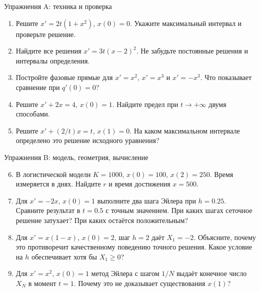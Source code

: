 \documentclass[aspectratio=169,11pt]{beamer}
\begin{document}
\begin{frame}{Упражнения A: техника и проверка}
\begin{enumerate}
\item Решите $x'=2t(1+x^2)$, $x(0)=0$.
Укажите максимальный интервал и проверьте решение.
\item Найдите все решения $x'=3t(x-2)^2$.
Не забудьте постоянные решения и интервалы определения.
\item Постройте фазовые прямые для $x'=x^2$,
$x'=x^3$ и $x'=-x^3$. Что показывает сравнение при $q'(0)=0$?
\item Решите $x'+2x=4$, $x(0)=1$.
Найдите предел при $t\to+\infty$ двумя способами.
\item Решите $x'+(2/t)x=t$, $x(1)=0$.
На каком максимальном интервале определено это решение исходного уравнения?
\end{enumerate}
\end{frame}

\begin{frame}{Упражнения B: модель, геометрия, вычисление}
\small
\begin{enumerate}
\setcounter{enumi}{5}
\item В логистической модели $K=1000$, $x(0)=100$, $x(2)=250$.
Время измеряется в днях. Найдите $r$ и время достижения $x=500$.
\item Для $x'=-2x$, $x(0)=1$ выполните два шага Эйлера при $h=0.25$.
Сравните результат в $t=0.5$ с точным значением.
При каких шагах сеточное решение затухает? При каких остаётся положительным?
\item Для $x'=x(1-x)$, $x(0)=2$, шаг $h=2$ даёт $X_1=-2$.
Объясните, почему это противоречит качественному поведению точного решения.
Какое условие на $h$ обеспечивает хотя бы $X_1\ge0$?
\item Для $x'=x^2$, $x(0)=1$ метод Эйлера с шагом $1/N$
выдаёт конечное число $X_N$ в момент $t=1$.
Почему это не доказывает существования $x(1)$?
\end{enumerate}
\end{frame}
\end{document}
